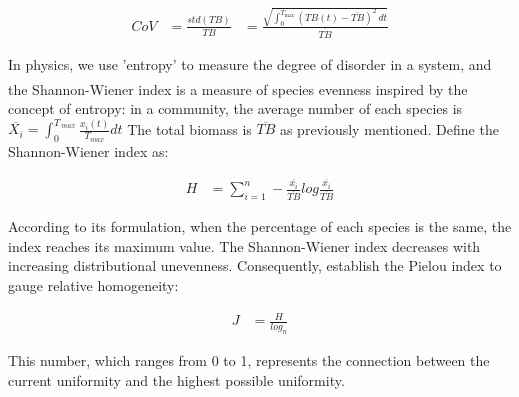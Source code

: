 \documentclass[12pt]{article}  %
\newcommand{\upcite}[1]{\textsuperscript{\textsuperscript{\cite{#1}}}}
\begin{document}
\begin{equation}
	\begin{aligned}
		 CoV &=  \frac {std(TB)}{TB} & =  \frac{\sqrt{\int_{0}^{T_{\max}} (TB(t) - \overline{TB})^2 \, dt}}{\overline{TB}} 
	\end{aligned}
\end{equation}
\par
In physics, we use 'entropy' to measure the degree of disorder in a system, and the Shannon-Wiener index\upcite{5} is a measure of species evenness inspired by the concept of entropy: in a community, the average number of each species is $\overline{X_i} = \int _ {0}^ {T_ {\ max }}\frac{x_i(t)}{T_{max}}dt$ The total biomass is $\overline{TB}$ as previously mentioned. Define the Shannon-Wiener index as:
\par
\begin{equation}
	\begin{aligned}
		H &= \sum_{i=1}^{n}-\frac{\overline{x_i}}{\overline{TB}}log\frac{\overline{x_i}}{\overline{TB}}
	\end{aligned}
\end{equation}
\par
According to its formulation, when the percentage of each species is the same, the index reaches its maximum value. The Shannon-Wiener index decreases with increasing distributional unevenness. Consequently, establish the Pielou index to gauge relative homogeneity:\par
\begin{equation}
	\begin{aligned}
		J &=\frac{H}{log_n}
	\end{aligned}
\end{equation}
\par
This number, which ranges from 0 to 1, represents the connection between the current uniformity and the highest possible uniformity.
\end{document}
